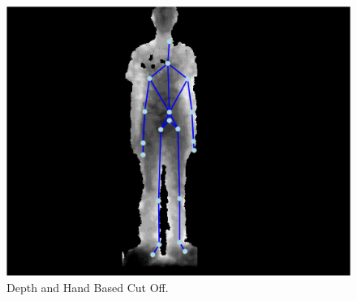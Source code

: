 \begin{figure}[h]
\begin{center}
\includegraphics[scale=0.4]{./testing/parse3} 
\end{center}
\caption{Depth and Hand Based Cut Off.}
\label{fig:depth and hand based cut off}
\end{figure} 